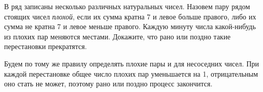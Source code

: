 \problem
{}
В ряд записаны несколько различных натуральных чисел.
Назовем пару рядом стоящих чисел \emph{плохой}, если их сумма кратна 7 и левое
больше правого, либо их сумма не кратна 7 и левое меньше правого.
Каждую минуту числа какой-нибудь из плохих пар меняются местами.
Докажите, что рано или поздно такие перестановки прекратятся.

\solution
Будем по тому же правилу определять плохие пары и для несоседних чисел.
При каждой перестановке общее число плохих пар уменьшается на 1, отрицательным
оно стать не может, поэтому рано или поздно процесс закончится.

\endproblem

